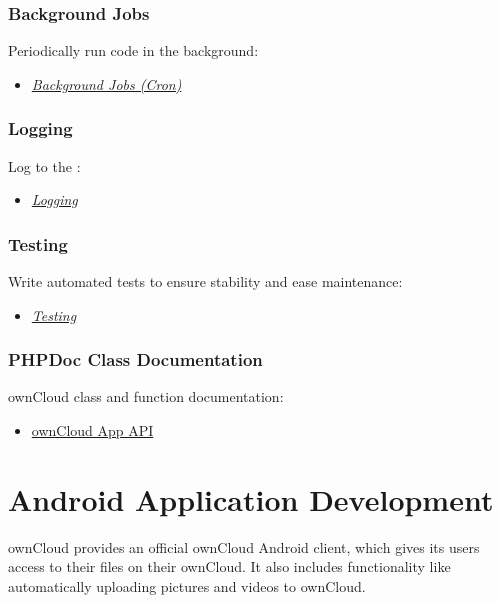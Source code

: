 \documentclass[letterpaper,10pt,english]{sphinxmanual}
\begin{document}
\subsubsection{Background Jobs}
\label{app/index:background-jobs}
Periodically run code in the background:
\begin{itemize}
\item {} 
{\hyperref[app/backgroundjobs::doc]{\emph{\emph{Background Jobs (Cron)}}}}

\end{itemize}


\subsubsection{Logging}
\label{app/index:logging}
Log to the :
\begin{itemize}
\item {} 
{\hyperref[app/logging::doc]{\emph{\emph{Logging}}}}

\end{itemize}


\subsubsection{Testing}
\label{app/index:testing}
Write automated tests to ensure stability and ease maintenance:
\begin{itemize}
\item {} 
{\hyperref[app/testing::doc]{\emph{\emph{Testing}}}}

\end{itemize}


\subsubsection{PHPDoc Class Documentation}
\label{app/index:phpdoc-class-documentation}
ownCloud class and function documentation:
\begin{itemize}
\item {} 
\href{https://api.owncloud.org/namespaces/OCP.html}{ownCloud App API}

\end{itemize}


\section{Android Application Development}
\label{android_library/index:androidindex}\label{android_library/index::doc}\label{android_library/index:android-application-development}
ownCloud provides an official ownCloud Android client, which gives its users
access to their files on their ownCloud. It also includes functionality like
automatically uploading pictures and videos to ownCloud.
\end{document}
